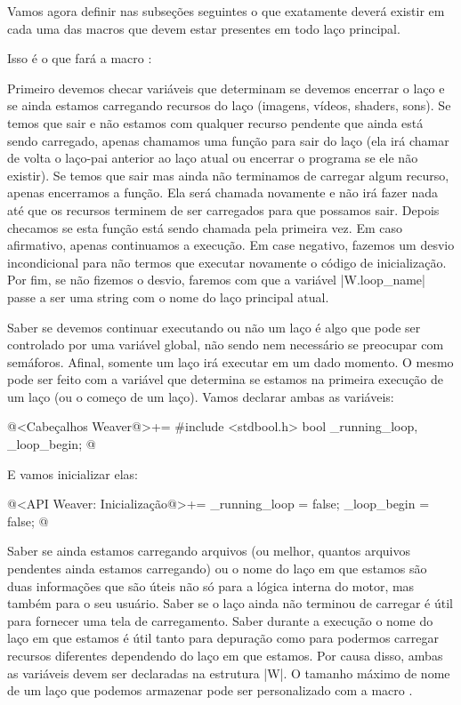 Vamos agora definir nas subseções seguintes o que exatamente deverá
existir em cada uma das macros que devem estar presentes em todo laço
principal.


Isso é o que fará a macro :

Primeiro devemos checar variáveis que determinam se devemos encerrar o
laço e se ainda estamos carregando recursos do laço (imagens, vídeos,
shaders, sons). Se temos que sair e não estamos com qualquer recurso
pendente que ainda está sendo carregado, apenas chamamos uma função
para sair do laço (ela irá chamar de volta o laço-pai anterior ao laço
atual ou encerrar o programa se ele não existir). Se temos que sair
mas ainda não terminamos de carregar algum recurso, apenas encerramos
a função. Ela será chamada novamente e não irá fazer nada até que os
recursos terminem de ser carregados para que possamos sair. Depois
checamos se esta função está sendo chamada pela primeira vez. Em caso
afirmativo, apenas continuamos a execução. Em case negativo, fazemos
um desvio incondicional para não termos que executar novamente o
código de inicialização. Por fim, se não fizemos o desvio, faremos com
que a variável |W.loop_name| passe a ser uma string com o nome do laço
principal atual.

Saber se devemos continuar executando ou não um laço é algo que pode
ser controlado por uma variável global, não sendo nem necessário se
preocupar com semáforos. Afinal, somente um laço irá executar em um
dado momento. O mesmo pode ser feito com a variável que determina se
estamos na primeira execução de um laço (ou o começo de um
laço). Vamos declarar ambas as variáveis:

\iniciocodigo
@<Cabeçalhos Weaver@>+=
#include <stdbool.h>
bool _running_loop, _loop_begin;
@
\fimcodigo

E vamos inicializar elas:

\iniciocodigo
@<API Weaver: Inicialização@>+=
_running_loop = false;
_loop_begin = false;
@
\fimcodigo

Saber se ainda estamos carregando arquivos (ou melhor, quantos
arquivos pendentes ainda estamos carregando) ou o nome do laço em que
estamos são duas informações que são úteis não só para a lógica
interna do motor, mas também para o seu usuário. Saber se o laço ainda
não terminou de carregar é útil para fornecer uma tela de
carregamento. Saber durante a execução o nome do laço em que estamos é
útil tanto para depuração como para podermos carregar recursos
diferentes dependendo do laço em que estamos. Por causa disso, ambas
as variáveis devem ser declaradas na estrutura |W|. O tamanho máximo
de nome de um laço que podemos armazenar pode ser personalizado com a
macro .

